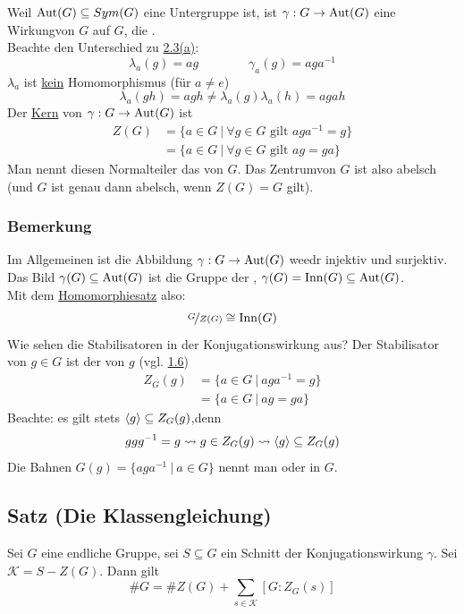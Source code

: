 Weil $\operatorname{Aut}(G)\subseteq Sym(G)$ eine Untergruppe ist, ist $\gamma:G\to \operatorname{Aut}(G)$ eine Wirkungvon $G$ auf $G$, die .\\
Beachte den Unterschied zu \hyperref[sub:bsp_wirkungen]{2.3(a)}:
\[\lambda_a(g)=ag\qquad\qquad \gamma_a(g)=aga^{-1}\]
$\lambda_a$ ist \uline{kein} Homomorphismus (für $a\not=e $) \[\lambda_a(gh)=agh\not= \lambda_a(g)\lambda_a(h)=agah \]
Der \uline{Kern} von $\gamma:G\to\operatorname{Aut}(G)$ ist
\begin{equation*}
\begin{aligned}
	Z(G) &= \{a\in G~|~\forall g\in G\text{ gilt }aga^{-1}=g\}\\
	&= \{a\in G~|~\forall g\in G\text{ gilt }ag=ga \}
\end{aligned}
\end{equation*}
Man nennt diesen Normalteiler das  von $G$. Das Zentrumvon $G$ ist also abelsch (und $G$ ist genau dann abelsch, wenn $Z(G)=G$ gilt).


\subsubsection*{Bemerkung}
Im Allgemeinen ist die Abbildung $\gamma:G\to\operatorname{Aut}(G)$ weedr injektiv und surjektiv. Das Bild $\gamma(G)\subseteq\operatorname{Aut}(G)$ ist die Gruppe der , $\gamma(G)=\operatorname{Inn}(G)\subseteq \operatorname{Aut}(G)$.\\
Mit dem \hyperref[sud:der_homomorphiesatz]{Homomorphiesatz} also: \[\nicefrac{G}{Z(G)}\cong\operatorname{Inn}(G)\]
Wie sehen die Stabilisatoren in der Konjugationswirkung aus? Der Stabilisator von $g\in G$ ist der  von $g$ (vgl. \hyperref[sub:def_zentralisieren]{1.6})
\begin{equation*}
\begin{aligned}
	Z_G(g) &= \{a\in G~|~aga^{-1}=g \}\\
	&= \{a\in G~|~ag=ga \}
\end{aligned}
\end{equation*}
Beachte: es gilt stets $\langle g \rangle\subseteq Z_G(g)$,denn \[ggg^{-1}=g \rightsquigarrow g\in Z_G(g) \rightsquigarrow \langle g \rangle\subseteq Z_G(g) \]
Die Bahnen $G(g)=\{aga^{-1}~|~a\in G\}$ nennt man  oder  in $G$.


\subsection{Satz (Die Klassengleichung)}
\label{sub:klassengleichung}
Sei $G$ eine endliche Gruppe, sei $S\subseteq G$ ein Schnitt der Konjugationswirkung $\gamma$. Sei $\mathcal{K}=S-Z(G)$. Dann gilt \[\#G=\#Z(G)+\sum_{s\in \mathcal{K}}[G:Z_G(s)] \]

